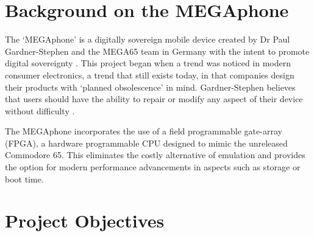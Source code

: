 
\section{Background on the MEGAphone}

The ‘MEGAphone’ is a digitally sovereign mobile device created by Dr Paul Gardner-Stephen and the MEGA65 team in Germany with the intent to promote digital sovereignty \cite{mega65}.
This project began when a trend was noticed in modern consumer electronics, a trend that still exists today, in that companies design their products with ‘planned obsolescence’ in mind. 
Gardner-Stephen believes that users should have the ability to repair or modify any aspect of their device without difficulty \cite{mobilehistory}.

The MEGAphone incorporates the use of a field programmable gate-array (FPGA), a hardware programmable CPU designed to mimic the unreleased Commodore 65.
This eliminates the costly alternative of emulation and provides the option for modern performance advancements in aspects such as storage or boot time.



\section{Project Objectives}

